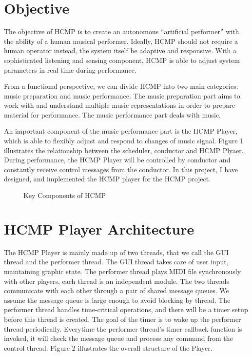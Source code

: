 \section{Objective}
The objective of HCMP \cite{Dawen:2011} is to create an autonomous 
``artificial performer'' with the ability of a human musical performer. 
Ideally, HCMP should not require a human operator instead, the system itself 
be adaptive and responsive. With a sophisticated listening and sensing
component, HCMP is able to adjust system parameters in real-time during 
performance. 

From a functional perspective, we can divide HCMP into two main
categories: music preparation and music performance. The music preparation
part aims to work with and understand multiple music representations in order
to prepare material for performance. The music
performance part deals with music.     

An important component of the music performance part is the HCMP Player, 
which is able to flexibly  
adjust and respond to changes of music signal. Figure 1 illustrates the relationship 
between the scheduler, conductor and HCMP Plyaer. During performance, the HCMP Player will 
be controlled by conductor and constantly receive control messages 
from the conductor. In this project, I have designed, and implemented the HCMP player 
for the HCMP project.
\begin{figure}[H] %
\caption{Key Components of HCMP}
\label{fig:speciation}
\end{figure}
 

\section{HCMP Player Architecture}
The HCMP Player is mainly made up of two threads, that we call the GUI thread 
and the performer thread. The GUI thread takes care of user input, maintaining 
graphic state. The performer thread plays MIDI file synchronously with other 
players, each thread is an independent 
module. The two threads communicate with each other through a pair of shared 
message queues. We assume the message 
queue is large enough to avoid blocking by thread. The performer thread
handles time-critical operations, and there will be a timer setup 
before this thread is created. The goal of the timer is to 
wake up the performer thread periodically. Everytime the performer 
thread's timer callback function is invoked, 
it will check the message queue and process any command from the control thread.
Figure 2 illustrates the overall structure of the Player.

